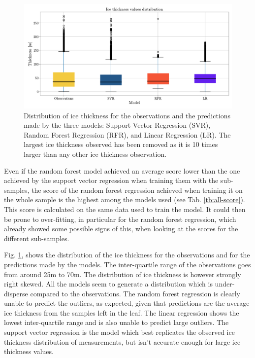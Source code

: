 \begin{figure}[!tp]
	\centering		  
	\includegraphics[width=1.\textwidth]{figures/thick_box.pdf}
	\caption{Distribution of ice thickness for the observations and the predictions made by the three models: Support Vector Regression (SVR), Random Forest Regression (RFR), and Linear Regression (LR). The largest ice thickness observed has been removed as it is 10 times larger than any other ice thickness observation.}
	\label{fig:thick-distr}
\end{figure}

Even if the random forest model achieved an average score lower than the one achieved by the support vector regression when training them with the sub-samples, the score of the random forest regression achieved when training it on the whole sample is the highest among the models used (see Tab. \ref{tb:all-score}). This score is calculated on the same data used to train the model. It could then be prone to over-fitting, in particular for the random forest regression, which already showed some possible signs of this, when looking at the scores for the different sub-samples.

Fig. \ref{fig:thick-distr}, shows the distribution of the ice thickness for the observations and for the predictions made by the models. The inter-quartile range of the observations goes from around 25m to 70m. The distribution of ice thickness is however strongly right skewed. All the models seem to generate a distribution which is under-disperse compared  to the observations. The random forest regression is clearly unable to predict the outliers, as expected, given that predictions are the average ice thickness from the samples left in the leaf. The linear regression shows the lowest inter-quartile range and is also unable to predict large outliers. The support vector regression is the model which best replicates the observed ice thickness distribution of measurements, but isn't accurate enough for large ice thickness values.


